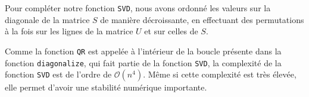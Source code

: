 Pour compléter notre fonction \verb|SVD|, nous avons ordonné les valeurs sur la diagonale de la matrice $S$ de manière décroissante, 
en effectuant des permutations à la fois sur les lignes de la matrice $U$ et sur celles de $S$.

Comme la fonction \verb|QR| est appelée à l'intérieur de la boucle présente dans la fonction \verb|diagonalize|, qui fait partie de la fonction \verb|SVD|,
la complexité de la fonction \verb|SVD| est de l'ordre de $\mathcal{O}(n^4)$.
Même si cette complexité est très élevée, elle permet d'avoir une stabilité numérique importante.